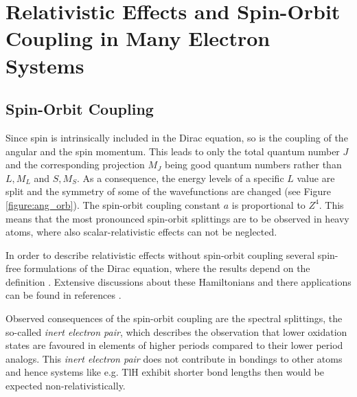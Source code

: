 \section{Relativistic Effects and Spin-Orbit Coupling in Many Electron Systems}
\subsection{Spin-Orbit Coupling}
Since spin is intrinsically included in the Dirac equation, so is the
coupling of the angular and the spin momentum. This leads to
only the total quantum number $J$ and the corresponding projection $M_J$
being good quantum numbers rather than $L, M_L$ and $S, M_S$. As a
consequence, the energy levels of a specific $L$ value are split and the
symmetry of some of the wavefunctions are changed (see Figure
\ref{figure:ang_orb}).
The spin-orbit coupling constant $a$ is proportional to $Z^4$.
This means that the most pronounced spin-orbit splittings are to be observed
in heavy atoms, where also scalar-relativistic effects can not be
neglected.

In order to describe relativistic effects without spin-orbit coupling
several spin-free formulations of the Dirac equation, where the results
depend on the definition \cite{Visscher99}.
Extensive discussions about these Hamiltonians and there applications
can be found in references \cite{ReiherWolf09,Saue11}.

Observed consequences of the spin-orbit coupling are the spectral splittings,
the so-called \emph{inert electron
pair}, which describes the observation that lower oxidation states
are favoured in elements of higher periods compared to their lower period
analogs. This \emph{inert electron pair} does not contribute in bondings
to other atoms and hence systems like e.g. TlH exhibit shorter bond lengths
then would be expected non-relativistically.


